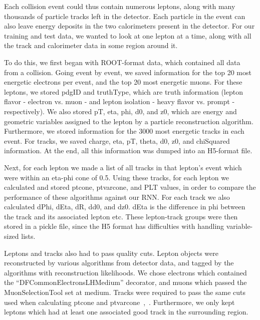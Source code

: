 
Each collision event could thus contain numerous leptons, along with many thousands of particle tracks left in the detector. Each particle in the event can also leave energy deposits in the two calorimeters present in the detector. For our training and test data, we wanted to look at one lepton at a time, along with all the track and calorimeter data in some region around it.

To do this, we first began with ROOT-format data, which contained all data from a collision. Going event by event, we saved information for the top 20 most energetic electrons per event, and the top 20 most energetic muons. For these leptons, we stored pdgID and truthType, which are truth information (lepton flavor - electron vs. muon - and lepton isolation - heavy flavor vs. prompt - respectively). We also stored pT, eta, phi, d0, and z0, which are energy and geometric variables assigned to the lepton by a particle reconstruction algorithm. Furthermore, we stored information for the 3000 most energetic tracks in each event. For tracks, we saved charge, eta, pT, theta, d0, z0, and chiSquared information. At the end, all this information was dumped into an H5-format file.

Next, for each lepton we made a list of all tracks in that lepton's event which were within an eta-phi cone of 0.5. Using these tracks, for each lepton we calculated and stored ptcone, ptvarcone, and PLT values, in order to compare the performance of these algorithms against our RNN. For each track we also calculated dPhi, dEta, dR, dd0, and dz0. dEta is the difference in phi between the track and its associated lepton etc. These lepton-track groups were then stored in a pickle file, since the H5 format has difficulties with handling variable-sized lists.

Leptons and tracks also had to pass quality cuts. Lepton objects were reconstructed by various algorithms from detector data, and tagged by the algorithms with reconstruction likelihoods. We chose electrons which contained the “DFCommonElectronsLHMedium” decorator, and muons which passed the MuonSelectionTool set at medium. Tracks were required to pass the same cuts used when calculating ptcone and ptvarcone~\cite{run2isolation},~\cite{trackingcp}. Furthermore, we only kept leptons which had at least one associated good track in the surrounding region.


